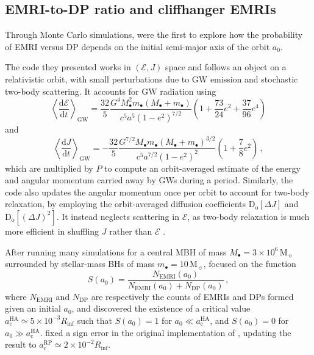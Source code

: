 \documentclass[desactivate]{aa}
\begin{document}
    \subsection{EMRI-to-DP ratio and cliffhanger EMRIs} \label{sec:cliff_region}

    Through Monte Carlo simulations, \citet{2005ApJ...629..362H} were the first to explore how the probability of EMRI versus DP depends on the initial semi-major axis of the orbit $a_0$.

    The code they presented works in $(\mathcal{E},J)$ space and follows an object on a relativistic orbit, with small perturbations due to GW emission and stochastic two-body scattering. It accounts for GW radiation using \citep{1964PhRv..136.1224P}
        \begin{equation} \label{eq:dE/dt}
            \left\langle \frac{\mathrm{d}\mathcal{E}}{\mathrm{d}t } \right\rangle_\mathrm{GW} = \frac{32}{5} \frac{G^4 M_\bullet^2 m_\bullet (M_\bullet + m_\bullet)}{c^5 a^5 (1-e^2)^{7/2}} \left( 1 + \frac{73}{24} e^2 + \frac{37}{96} e^4 \right)
        \end{equation}
        and
        \begin{equation}
            \left\langle \frac{\mathrm{d}J}{\mathrm{d}t } \right\rangle_\mathrm{GW} = - \frac{32}{5} \frac{G^{7/2}M_\bullet m_\bullet(M_\bullet+m_\bullet)^{3/2}}{c^5a^{7/2}(1-e^2)^2} \left( 1+ \frac{7}{8} e^2 \right) \, ,
        \end{equation}
        which are multiplied by $P$ to compute an orbit-averaged estimate of the energy and angular momentum carried away by GWs during a period. Similarly, the code also updates the angular momentum once per orbit to account for two-body relaxation, by employing the orbit-averaged diffusion coefficients $\mathrm{D_o}[\Delta J]$ and $\mathrm{D_o}\left[\left(\Delta J\right)^2\right]$. It instead neglects scattering in $\mathcal{E}$, as two-body relaxation is much more efficient in shuffling $J$ rather than $\mathcal{E}$ \citep{2008gady.book.....B,2013degn.book.....M}. 
        
        After running many simulations for a central MBH of mass $M_\bullet = 3 \times 10^6 \, \mathrm{M_\sun}$ surrounded by stellar-mass BHs of mass $m_\bullet = 10 \, \mathrm{M_\sun}$, \citet{2005ApJ...629..362H} focused on the function
        \begin{equation}
           S(a_0) = \frac{N_\mathrm{EMRI}(a_0)}{N_\mathrm{EMRI}(a_0)+N_\mathrm{DP}(a_0)} \, ,
        \end{equation}
        where $N_\mathrm{EMRI}$ and $N_\mathrm{DP}$ are respectively the counts of EMRIs and DPs formed given an initial $a_0$, and discovered the existence of a critical value $a_\mathrm{c}^\mathrm{HA} \simeq 5 \times 10^{-3} R_\mathrm{inf}$ such that $S(a_0) = 1$ for $a_0 \ll a_\mathrm{c}^\mathrm{HA}$, and $S(a_0) = 0$ for $a_0 \gg a_\mathrm{c}^\mathrm{HA}$. \citet{2021MNRAS.501.5012R} fixed a sign error in the original implementation of \citet{2005ApJ...629..362H}, updating the result to $a_\mathrm{c}^\mathrm{RP} \simeq 2 \times 10^{-2} R_\mathrm{inf}$.
        
\end{document}
